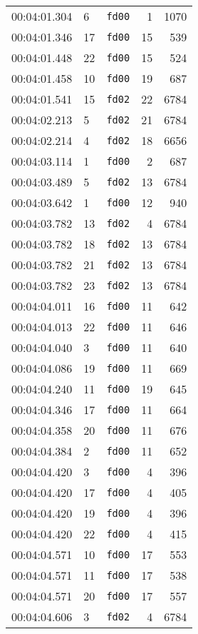 \documentclass{article}
\begin{document}
\begin{longtable}{lllrr}
00:04:01.304 & 6 & \texttt{fd00} & 1 & 1070 \\
00:04:01.346 & 17 & \texttt{fd00} & 15 & 539 \\
00:04:01.448 & 22 & \texttt{fd00} & 15 & 524 \\
00:04:01.458 & 10 & \texttt{fd00} & 19 & 687 \\
00:04:01.541 & 15 & \texttt{fd02} & 22 & 6784 \\
00:04:02.213 & 5 & \texttt{fd02} & 21 & 6784 \\
00:04:02.214 & 4 & \texttt{fd02} & 18 & 6656 \\
00:04:03.114 & 1 & \texttt{fd00} & 2 & 687 \\
00:04:03.489 & 5 & \texttt{fd02} & 13 & 6784 \\
00:04:03.642 & 1 & \texttt{fd00} & 12 & 940 \\
00:04:03.782 & 13 & \texttt{fd02} & 4 & 6784 \\
00:04:03.782 & 18 & \texttt{fd02} & 13 & 6784 \\
00:04:03.782 & 21 & \texttt{fd02} & 13 & 6784 \\
00:04:03.782 & 23 & \texttt{fd02} & 13 & 6784 \\
00:04:04.011 & 16 & \texttt{fd00} & 11 & 642 \\
00:04:04.013 & 22 & \texttt{fd00} & 11 & 646 \\
00:04:04.040 & 3 & \texttt{fd00} & 11 & 640 \\
00:04:04.086 & 19 & \texttt{fd00} & 11 & 669 \\
00:04:04.240 & 11 & \texttt{fd00} & 19 & 645 \\
00:04:04.346 & 17 & \texttt{fd00} & 11 & 664 \\
00:04:04.358 & 20 & \texttt{fd00} & 11 & 676 \\
00:04:04.384 & 2 & \texttt{fd00} & 11 & 652 \\
00:04:04.420 & 3 & \texttt{fd00} & 4 & 396 \\
00:04:04.420 & 17 & \texttt{fd00} & 4 & 405 \\
00:04:04.420 & 19 & \texttt{fd00} & 4 & 396 \\
00:04:04.420 & 22 & \texttt{fd00} & 4 & 415 \\
00:04:04.571 & 10 & \texttt{fd00} & 17 & 553 \\
00:04:04.571 & 11 & \texttt{fd00} & 17 & 538 \\
00:04:04.571 & 20 & \texttt{fd00} & 17 & 557 \\
00:04:04.606 & 3 & \texttt{fd02} & 4 & 6784 \\

\end{longtable}
\end{document}
